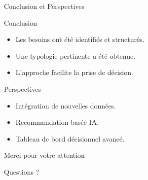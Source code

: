 \documentclass[aspectratio=169]{beamer}
\begin{document}
\begin{frame}{Conclusion et Perspectives}
	
	\begin{block}{Conclusion}
		
		\begin{itemize}
			\item Les besoins ont été identifiés et structurés.
			\item Une typologie pertinente a été obtenue.
			\item L'approche facilite la prise de décision.
		\end{itemize}
		
	\end{block}
	
	\begin{block}{Perspectives}
		
		\begin{itemize}
			\item Intégration de nouvelles données.
			\item Recommandation basée IA.
			\item Tableau de bord décisionnel avancé.
		\end{itemize}
		
	\end{block}
	
\end{frame}

\begin{frame}
	
	\centering
	
	\vspace{2cm}
	
	{\Huge Merci pour votre attention}
	
	\vspace{1cm}
	
	{\Large Questions ?}
	
\end{frame}
\end{document}
